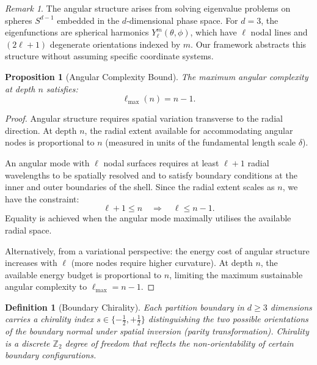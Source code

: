 \documentclass[twocolumn,10pt,a4paper]{article}
\newtheorem{proposition}[theorem]{Proposition}
\newtheorem{definition}[theorem]{Definition}
\theoremstyle{remark}
\newtheorem{remark}[theorem]{Remark}
\newcommand{\Integers}{\mathbb{Z}}
\begin{document}
\begin{remark}
The angular structure arises from solving eigenvalue problems on spheres $S^{d-1}$ embedded in the $d$-dimensional phase space. For $d = 3$, the eigenfunctions are spherical harmonics $Y_\ell^m(\theta, \phi)$, which have $\ell$ nodal lines and $(2\ell+1)$ degenerate orientations indexed by $m$. Our framework abstracts this structure without assuming specific coordinate systems.
\end{remark}

\begin{proposition}[Angular Complexity Bound]
\label{prop:angular_bound}
The maximum angular complexity at depth $n$ satisfies:
\begin{equation}
\ell_{\max}(n) = n - 1.
\end{equation}
\end{proposition}

\begin{proof}
Angular structure requires spatial variation transverse to the radial direction. At depth $n$, the radial extent available for accommodating angular nodes is proportional to $n$ (measured in units of the fundamental length scale $\delta$). 

An angular mode with $\ell$ nodal surfaces requires at least $\ell + 1$ radial wavelengths to be spatially resolved and to satisfy boundary conditions at the inner and outer boundaries of the shell. Since the radial extent scales as $n$, we have the constraint:
\begin{equation}
\ell + 1 \leq n \quad \Rightarrow \quad \ell \leq n - 1.
\end{equation}
Equality is achieved when the angular mode maximally utilises the available radial space.

Alternatively, from a variational perspective: the energy cost of angular structure increases with $\ell$ (more nodes require higher curvature). At depth $n$, the available energy budget is proportional to $n$, limiting the maximum sustainable angular complexity to $\ell_{\max} = n - 1$.
\end{proof}

\begin{definition}[Boundary Chirality]
\label{def:chirality}
Each partition boundary in $d \geq 3$ dimensions carries a \emph{chirality} index $s \in \{-\tfrac{1}{2}, +\tfrac{1}{2}\}$ distinguishing the two possible orientations of the boundary normal under spatial inversion (parity transformation). Chirality is a discrete $\Integers_2$ degree of freedom that reflects the non-orientability of certain boundary configurations.
\end{definition}
\end{document}
